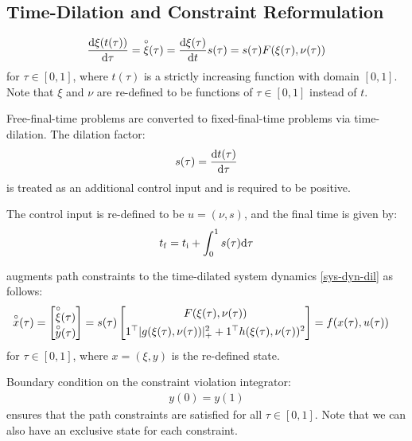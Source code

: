 \documentclass[11pt,a4paper]{article}
\begin{document}
\subsection{Time-Dilation and Constraint Reformulation}
\begin{align}
     \frac{\mathrm{d}\xi(t(\tau))}{\mathrm{d}\tau} = \overset{\circ}{\xi}(\tau) = \frac{\mathrm{d}\xi(\tau)}{\mathrm{d}t}s(\tau) = s(\tau)F(\xi(\tau),\nu(\tau))\label{sys-dyn-dil}
\end{align}
for $\tau\in[0,1]$, where $t(\tau)$ is a strictly increasing function with domain $[0,1]$. Note that $\xi$ and $\nu$ are re-defined to be functions of $\tau\in[0,1]$ instead of $t$. 

Free-final-time problems are converted to fixed-final-time problems via time-dilation. The dilation factor:
$$
    s(\tau) = \frac{\mathrm{d}t(\tau)}{\mathrm{d}\tau}
$$ 
is treated as an additional control input and is required to be positive.

The control input is re-defined to be $u = (\nu,s)$, and the final time is given by:
$$
    t_{\mathrm{f}} = t_{\mathrm{i}} + \int_0^1s(\tau)\mathrm{d}\tau
$$

 augments path constraints to the time-dilated system  dynamics \eqref{sys-dyn-dil} as follows:
\begin{align}
    & \overset{\circ}{x}(\tau) = \begin{bmatrix}
                           \overset{\circ}{\xi}(\tau) \\
                           \overset{\circ}{y}(\tau) 
                       \end{bmatrix} = s(\tau)\begin{bmatrix}
                                           F(\xi(\tau),\nu(\tau)) \\[0.15cm]
                                           1^\top |g(\xi(\tau),\nu(\tau))|^2_+ + 1^\top h(\xi(\tau),\nu(\tau))^2
                                       \end{bmatrix} = f(x(\tau),u(\tau))\label{sys-dyn-dil-aug}
\end{align}
for $\tau\in[0,1]$, where $x=(\xi,y)$ is the re-defined state. 

Boundary condition on the constraint violation integrator:
\begin{align}
    y(0) = y(1) \label{cnstr-integrator-bc}
\end{align}
ensures that the path constraints are satisfied for all $\tau\in[0,1]$. Note that we can also have an exclusive state for each constraint.
\end{document}
